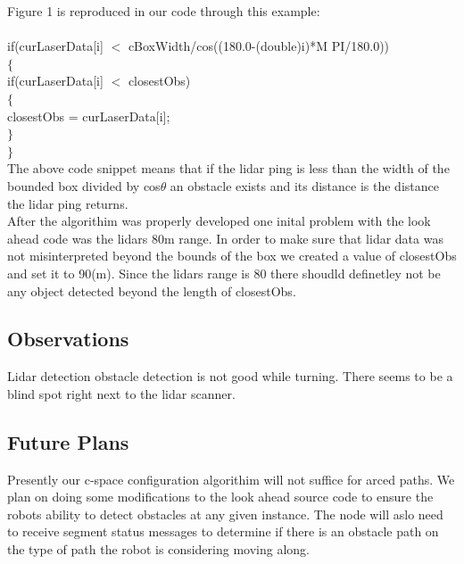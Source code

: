 \documentclass{article}
\begin{document}
Figure 1 is reproduced in our code through this example:\\\\
\indent if(curLaserData[i] $<$ cBoxWidth/cos((180.0-(double)i)*M PI/180.0))\\
\indent \indent$\{$\\
\indent \indent \indent if(curLaserData[i] $<$ closestObs)\\
\indent \indent \indent$\{$\\
\indent \indent closestObs = curLaserData[i];\\
\indent \indent \indent$\}$\\
\indent \indent$\}$\\
The above code snippet means that if the lidar ping is less than the width of the bounded box divided by cos$\theta$ an obstacle exists and its distance is the distance the lidar ping returns.\\

After the algorithim was properly developed one inital problem with the look ahead code was the lidars 80m
range. In order to make sure that lidar data was not misinterpreted beyond
the bounds of the box we created a value of closestObs and set it to 90(m).
Since the lidars range is 80 there shoudld definetley not be any object detected
beyond the length of closestObs.

\subsection{Observations}
Lidar detection obstacle detection is not good while turning. There seems to be
a blind spot right next to the lidar scanner.

\subsection{Future Plans}
Presently our c-space configuration algorithim will not suffice for arced paths. We plan on doing some modifications to the look ahead source code to ensure the robots ability to detect obstacles at any given instance. The node will aslo need to receive segment status messages to determine if there is an obstacle path on the type of path the robot is considering moving along.
\end{document}
